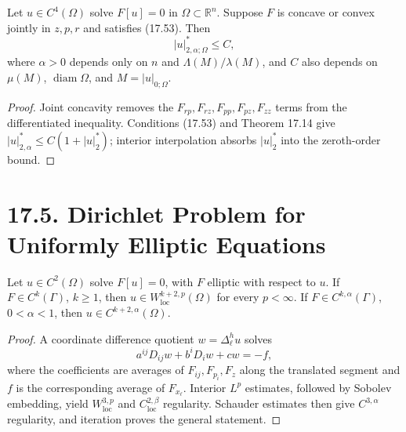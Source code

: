 \begin{theorem}
\label{gt-ch17-thm-interior-hessian-natural-structure}
Let $u\in C^4(\Omega)$ solve $F[u]=0$ in $\Omega\subset\mathbb R^n$.
Suppose $F$ is concave or convex jointly in $z,p,r$ and satisfies (17.53).
Then
\begin{equation}\tag{17.54}
|u|^*_{2,\alpha;\Omega}\le C,
\end{equation}
where $\alpha>0$ depends only on $n$ and $\Lambda(M)/\lambda(M)$, and $C$
also depends on $\mu(M)$, $\operatorname{diam}\Omega$, and
$M=|u|_{0;\Omega}$.
\end{theorem}
\begin{proof}
\sketch Joint concavity removes the $F_{rp},F_{rz},F_{pp},F_{pz},F_{zz}$
terms from the differentiated inequality.  Conditions (17.53) and Theorem
17.14 give $|u|^*_{2,\alpha}\le C(1+|u|^*_2)$; interior interpolation absorbs
$|u|^*_2$ into the zeroth-order bound.
\end{proof}

\section*{17.5. Dirichlet Problem for Uniformly Elliptic Equations}

\begin{lemma}
\label{gt-ch17-lem-interior-regularity-difference-quotients}
Let $u\in C^2(\Omega)$ solve $F[u]=0$, with $F$ elliptic with respect to $u$.
If $F\in C^k(\Gamma)$, $k\ge1$, then
$u\in W^{k+2,p}_{\mathrm{loc}}(\Omega)$ for every $p<\infty$.  If
$F\in C^{k,\alpha}(\Gamma)$, $0<\alpha<1$, then
$u\in C^{k+2,\alpha}(\Omega)$.
\end{lemma}
\begin{proof}
\sketch A coordinate difference quotient $w=\Delta_\ell^hu$ solves
\begin{equation}\tag{17.56}
a^{ij}D_{ij}w+b^iD_iw+cw=-f,
\end{equation}
where the coefficients are averages of $F_{ij},F_{p_i},F_z$ along the
translated segment and $f$ is the corresponding average of $F_{x_\ell}$.
Interior $L^p$ estimates, followed by Sobolev embedding, yield
$W^{3,p}_{\mathrm{loc}}$ and $C^{2,\beta}_{\mathrm{loc}}$ regularity.
Schauder estimates then give $C^{3,\alpha}$ regularity, and iteration proves
the general statement.
\end{proof}

